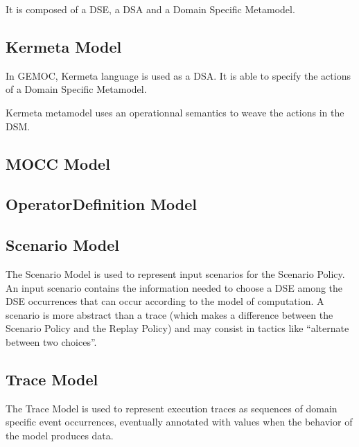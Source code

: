 \documentclass{gemoc} %
\begin{document}
It is composed of a DSE, a DSA and a Domain Specific Metamodel.


\subsection{Kermeta Model}
\label{sec:Kermeta_Model}
In GEMOC, Kermeta language is used as a DSA.
It is able to specify the actions of a Domain Specific Metamodel.

Kermeta metamodel uses an operationnal semantics to weave the actions in the DSM.

\subsection{MOCC Model}
\label{sec:MOCC_Model}


\subsection{OperatorDefinition Model}
\label{sec:OperatorDefinition_Model}


\subsection{Scenario Model}
\label{sec:Scenario_Model}
The Scenario Model is used to represent input scenarios for the Scenario Policy. An input scenario contains the information needed to choose a DSE among the DSE occurrences that can occur according to the model of computation. A scenario is more abstract than a trace (which makes a difference between the Scenario Policy and the Replay Policy) and may consist in tactics like ``alternate between two choices''.

\subsection{Trace Model}
\label{sec:Trace_Model}
The Trace Model is used to represent execution traces as sequences of domain specific event occurrences, eventually annotated with values when the behavior of the model produces data.
\end{document}
